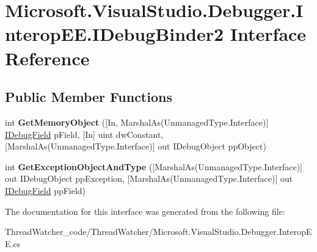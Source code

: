 \hypertarget{interface_microsoft_1_1_visual_studio_1_1_debugger_1_1_interop_e_e_1_1_i_debug_binder2}{\section{Microsoft.\+Visual\+Studio.\+Debugger.\+Interop\+E\+E.\+I\+Debug\+Binder2 Interface Reference}
\label{interface_microsoft_1_1_visual_studio_1_1_debugger_1_1_interop_e_e_1_1_i_debug_binder2}
}
\subsection*{Public Member Functions}
\begin{DoxyCompactItemize}
\item 
\hypertarget{interface_microsoft_1_1_visual_studio_1_1_debugger_1_1_interop_e_e_1_1_i_debug_binder2_a0150f3f52034bde6d33f6f3290f67bf8}{int {\bfseries Get\+Memory\+Object} (\mbox{[}In, Marshal\+As(Unmanaged\+Type.\+Interface)\mbox{]} \hyperlink{interface_microsoft_1_1_visual_studio_1_1_debugger_1_1_interop_e_e_1_1_i_debug_field}{I\+Debug\+Field} p\+Field, \mbox{[}In\mbox{]} uint dw\+Constant, \mbox{[}Marshal\+As(Unmanaged\+Type.\+Interface)\mbox{]} out I\+Debug\+Object pp\+Object)}\label{interface_microsoft_1_1_visual_studio_1_1_debugger_1_1_interop_e_e_1_1_i_debug_binder2_a0150f3f52034bde6d33f6f3290f67bf8}

\item 
\hypertarget{interface_microsoft_1_1_visual_studio_1_1_debugger_1_1_interop_e_e_1_1_i_debug_binder2_a32f5f5afd00fc9c4c0079bc24278a133}{int {\bfseries Get\+Exception\+Object\+And\+Type} (\mbox{[}Marshal\+As(Unmanaged\+Type.\+Interface)\mbox{]} out I\+Debug\+Object pp\+Exception, \mbox{[}Marshal\+As(Unmanaged\+Type.\+Interface)\mbox{]} out \hyperlink{interface_microsoft_1_1_visual_studio_1_1_debugger_1_1_interop_e_e_1_1_i_debug_field}{I\+Debug\+Field} pp\+Field)}\label{interface_microsoft_1_1_visual_studio_1_1_debugger_1_1_interop_e_e_1_1_i_debug_binder2_a32f5f5afd00fc9c4c0079bc24278a133}

\end{DoxyCompactItemize}


The documentation for this interface was generated from the following file\+:\begin{DoxyCompactItemize}
\item 
Thread\+Watcher\+\_\+code/\+Thread\+Watcher/Microsoft.\+Visual\+Studio.\+Debugger.\+Interop\+E\+E.\+cs\end{DoxyCompactItemize}
